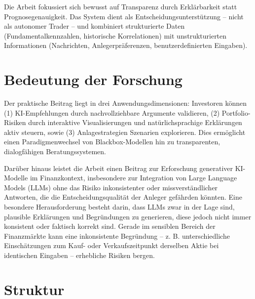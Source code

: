 Die Arbeit fokussiert sich bewusst auf Transparenz durch Erklärbarkeit statt Prognosegenauigkeit.
Das System dient als Entscheidungsunterstützung -- nicht als autonomer Trader -- und kombiniert strukturierte Daten (Fundamentalkennzahlen, historische Korrelationen) mit unstrukturierten Informationen (Nachrichten, Anlegerpräferenzen, benutzerdefinierten Eingaben).


\section{Bedeutung der Forschung}

Der praktische Beitrag liegt in drei Anwendungsdimensionen:
Investoren können (1) \acs{KI}-Empfehlungen durch nachvollziehbare Argumente validieren, (2) Portfolio-Risiken durch interaktive Visualisierungen und natürlichsprachige Erklärungen aktiv steuern, sowie (3) Anlagestrategien Szenarien explorieren.
Dies ermöglicht einen Paradigmenwechsel von Blackbox-Modellen hin zu transparenten, dialogfähigen Beratungssystemen.

Darüber hinaus leistet die Arbeit einen Beitrag zur Erforschung generativer \acs{KI}-Modelle im Finanzkontext, insbesondere zur Integration von Large Language Models (\acs{LLM}s) ohne das Risiko inkonsistenter oder missverständlicher Antworten, die die Entscheidungsqualität der Anleger gefährden könnten.
Eine besondere Herausforderung besteht darin, dass \acs{LLM}s zwar in der Lage sind, plausible Erklärungen und Begründungen zu generieren, diese jedoch nicht immer konsistent oder faktisch korrekt sind.
Gerade im sensiblen Bereich der Finanzmärkte kann eine inkonsistente Begründung -- z. B. unterschiedliche Einschätzungen zum Kauf- oder Verkaufszeitpunkt derselben Aktie bei identischen Eingaben -- erhebliche Risiken bergen.

\section{Struktur}



